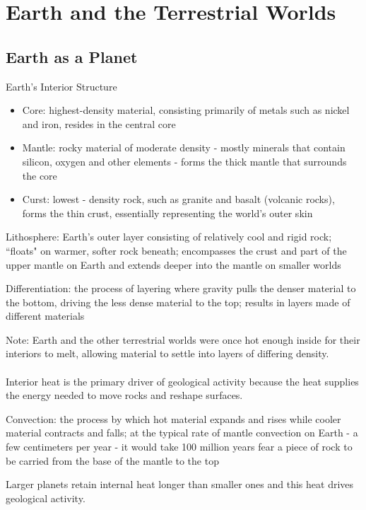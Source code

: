 \documentclass[12pt]{article}
\begin{document}
\section{Earth and the Terrestrial Worlds} 
\subsection{Earth as a Planet}
Earth's Interior Structure \begin{itemize}
\item Core: highest-density material, consisting primarily of metals such as nickel and iron, resides in the central core 
\item Mantle: rocky material of moderate density - mostly minerals that contain silicon, oxygen and other elements - forms the thick mantle that surrounds the core 
\item Curst: lowest - density rock, such as granite and basalt (volcanic rocks), forms the thin crust, essentially representing the world's outer skin \end{itemize} 
\begin{definition} Lithosphere: Earth's outer layer consisting of relatively cool and rigid rock; ``floats" on warmer, softer rock beneath; encompasses the crust and part of the upper mantle on Earth and extends deeper into the mantle on smaller worlds \end{definition} 
\begin{definition} Differentiation: the process of layering where gravity pulls the denser material to the bottom, driving the less dense material to the top; results in layers made of different materials \end{definition} 
Note: Earth and the other terrestrial worlds were once hot enough inside for their interiors to melt, allowing material to settle into layers of differing density. \\~\\
Interior heat is the primary driver of geological activity because the heat supplies the energy needed to move rocks and reshape surfaces. 
\begin{definition} Convection: the process by which hot material expands and rises while cooler material contracts and falls; at the typical rate of mantle convection on Earth - a few centimeters per year - it would take 100 million years fear a piece of rock to be carried from the base of the mantle to the top \end{definition} 
Larger planets retain internal heat longer than smaller ones and this heat drives geological activity. \\~\\
\end{document}

